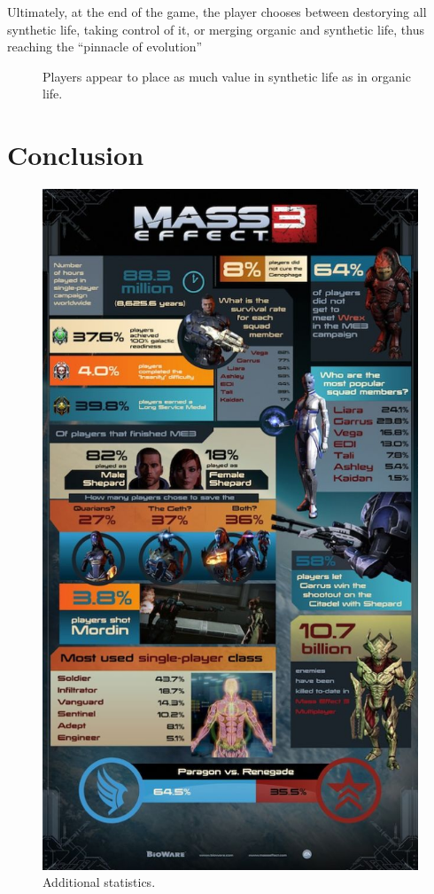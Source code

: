 \documentclass[journal]{IEEEtran}
\begin{document}
Ultimately, at the end of the game, the player chooses between destorying
all synthetic life, taking control of it, or merging organic and synthetic life,
thus reaching the ``pinnacle of evolution''\cite{me}
\begin{figure}
 \begin{adjustbox}{width=.35\textwidth}
 \end{adjustbox}
 \caption{Players appear to place as much value in synthetic life as in organic life. \cite{ea}}
\end{figure}

\section{Conclusion}
\lipsum[7]
\nocite{*}



\begin{figure}[]
 \includegraphics[width=.45\textwidth]{stat.jpg}
 \caption{Additional statistics. \cite{ea}}
\end{figure}
\end{document}

